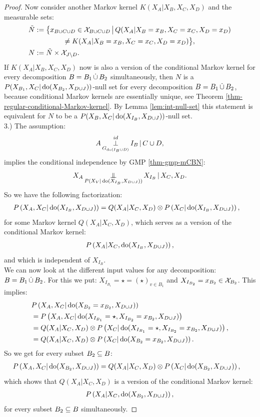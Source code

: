 \begin{Prp}
\begin{proof}
Now consider another Markov kernel $K(X_A|X_B,X_C,X_D)$ and the measurable sets:
\begin{align*}
    \tilde N &:= \bigl\{ x_{B \cup C \cup D} \in \mathcal{X}_{B \cup C \cup D} \,\big|\,  Q(X_A|X_B=x_B,X_C=x_C,X_D=x_D) \\ 
    & \qquad \qquad  \neq K(X_A|X_B=x_B,X_C=x_C,X_D=x_D)  \bigr\},\\
  N &:= \tilde N \times \mathcal{X}_{J \setminus D}.
\end{align*}
If $K(X_A|X_B,X_C,X_D)$ now is also a version of the conditional Markov kernel  
for every decomposition $B=B_1 \,\dot{\cup}\, B_2$ simultaneously, then $N$ is a 
$P(X_{B_1},X_C|\operatorname{do}(X_{B_2},X_{D\cup J}))$-null set for every decomposition $B=B_1 \,\dot{\cup}\, B_2$, 
because conditional Markov kernels are essentially unique, see Theorem \ref{thm-regular-conditional-Markov-kernel}. 
By Lemma \ref{lem:int-null-set} this statement is equivalent for $N$ to be a 
$P(X_B,X_C|\operatorname{do}(X_{I_B},X_{D\cup J}))$-null set.\\


3.) The assumption:
            \[ A \operatorname*{\perp}^{id}_{G_{\operatorname{do}(I_B \cup D)}} I_B \operatorname*{|} C  \cup D,   \]
implies the conditional independence by GMP \ref{thm-gmp-mCBN}:
\[ X_A \operatorname*{\perp\mkern-11mu\perp}_{P(X_V|\operatorname{do}(X_{I_B},X_{D\cup J}))} X_{I_B} \operatorname*{|} X_C,X_D.\]
So we have the following factorization:
\begin{align} 
    P\left ( X_A,X_C|\operatorname{do}(X_{I_B},X_{D\cup J})\right ) &= Q(X_A|X_C,X_D) \otimes P\left ( X_C|\operatorname{do}(X_{I_B},X_{D\cup J})\right ),
\label{eq:3nd-do-int-1} 
\end{align}
for some Markov kernel $Q(X_A|X_C,X_D)$, which serves as a version of the conditional Markov kernel:
\[P\left ( X_A|X_C,\operatorname{do}(X_{I_B},X_{D\cup J})\right ),\]
and which is independent of $X_{I_B}$.\\ 
We can now look at the different input values for any decomposition: $B=B_1 \,\dot{\cup}\, B_2$.
For this we put: $X_{I_{B_1}}= \star = (\star)_{v \in B_1}$ and  $ X_{I_{B_2}}=x_{B_2} \in \mathcal{X}_{B_2}$.
This implies:
\begin{align*} 
  & P\left ( X_A,X_C|\operatorname{do}(X_{{B_2}}=x_{B_2},X_{D\cup J})\right ) \\
  &= P\left ( X_A,X_C|\operatorname{do}(X_{I_{B_1}}=\star,X_{I_{B_2}}=x_{B_2},X_{D\cup J})\right ) \\
  &= Q(X_A|X_C,X_D) \otimes P\left ( X_C|\operatorname{do}(X_{I_{B_1}}=\star,X_{I_{B_2}}=x_{B_2},X_{D\cup J})\right ),\\
  &= Q(X_A|X_C,X_D) \otimes P\left ( X_C|\operatorname{do}(X_{{B_2}}=x_{B_2},X_{D\cup J})\right ).
\end{align*}
So we get for every subset $B_2 \subseteq B$:
\begin{align} 
    P\left ( X_A,X_C|\operatorname{do}(X_{B_2},X_{D\cup J})\right ) &= Q(X_A|X_C,X_D) \otimes P\left ( X_C|\operatorname{do}(X_{B_2},X_{D\cup J})\right ), \label{eq:3nd-do-int-2} 
\end{align}
which shows that $Q(X_A|X_C,X_D)$ is a version of the conditional Markov kernel:
\begin{align} P\left ( X_A|X_C,\operatorname{do}(X_{B_2},X_{D\cup J})\right ), \label{eq:3nd-do-int-3}  \end{align}
for every subset $B_2 \subseteq B$ simultaneously.


\end{proof}
\end{Prp}
